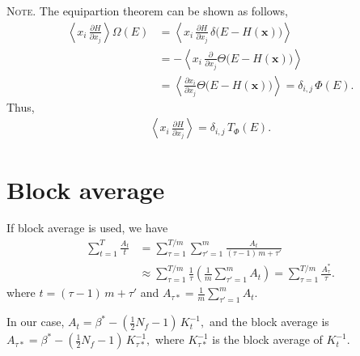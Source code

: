 \documentclass[reprint]{revtex4-1}
\newcommand{\note}[1]{{\color{DarkGreen}\footnotesize \textsc{Note.} #1}}
\begin{document}
\note{
  The equipartion theorem can be shown as follows,
  \begin{align*}
    \left\langle
      x_i \,
      \frac{ \partial H } { \partial x_j }
    \right\rangle
    \Omega(E)
    &=
    \left\langle
      x_i \,
      \frac{ \partial H } { \partial x_j }
      \,
      \delta\bigl(
        E - H(\mathbf x)
      \bigr)
    \right\rangle \\
    &=
    -
    \left\langle
      x_i \,
      \frac{ \partial } { \partial x_j }
      \Theta\bigl(
        E - H(\mathbf x)
      \bigr)
    \right\rangle
    \\
    &=
    \left\langle
      \frac{ \partial x_i } { \partial x_j }
      \Theta\bigl(
        E - H(\mathbf x)
      \bigr)
    \right\rangle
    =
    \delta_{i, j} \, \Phi(E)
    .
  \end{align*}
  Thus,
  \begin{align*}
    \left\langle
      x_i \,
      \frac{ \partial H } { \partial x_j }
    \right\rangle
    =
    \delta_{i, j} \, T_\Phi(E)
    .
  \end{align*}
}



\section{\label{sec:block}
Block average}



If block average is used, we have
%
\begin{align*}
  \sum_{t = 1}^T \frac{ A_t } { t }
  &=
  \sum_{\tau = 1}^{T/m}
  \sum_{\tau' = 1}^{m}
  \frac{ A_t } { (\tau - 1) \, m + \tau' }
  \\
  &\approx
  \sum_{\tau = 1}^{T/m}
  \frac{ 1 } { \tau }
  \left(
    \frac 1 m
    \sum_{\tau' = 1}^m
    A_t
  \right)
  =
  \sum_{\tau = 1}^{T/m}
  \frac{ A^*_\tau } { \tau }
  .
\end{align*}
%
where
$t = (\tau - 1) \, m + \tau'$
and
$
A_{\tau*} = \frac 1 m
\sum_{\tau' = 1}^m A_t.
$

In our case,
$
A_t = \beta^* - \left(\frac {1} {2} N_f - 1\right) \, K_t^{-1},
$
and the block average is
$
A_{\tau*}
= \beta^* - \left(\frac {1} {2} N_f - 1\right) \, K_{\tau*}^{-1},
$
where $K_{\tau*}^{-1}$
is the block average of $K_t^{-1}$.

%

\end{document}
